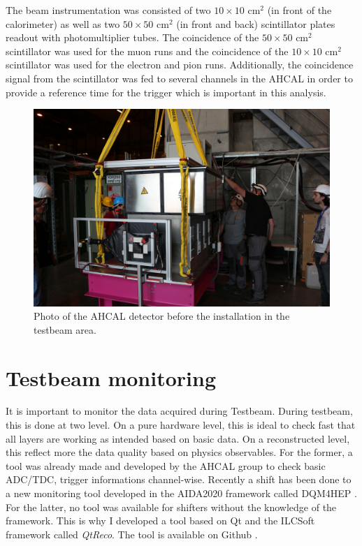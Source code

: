 The beam instrumentation was consisted of two $10 \times 10$ cm$^2$ (in front of the calorimeter) as well as two $50 \times 50$ cm$^2$ (in front and back) scintillator plates readout with photomultiplier tubes. The coincidence of the $50 \times 50$ cm$^2$ scintillator was used for the muon runs and the coincidence of the $10 \times 10$ cm$^2$ scintillator was used for the electron and pion runs. Additionally, the coincidence signal from the scintillator was fed to several channels in the AHCAL in order to provide a reference time for the trigger which is important in this analysis.

\begin{figure}[htbp!]
	\centering
	\includegraphics[width=0.7\linewidth]{chap5/fig_EnergyCalib/IMG_1170.jpg}
	\caption{Photo of the AHCAL detector before the installation in the testbeam area.} \label{fig:AHCAL_photo}
\end{figure}

\section{Testbeam monitoring}

It is important to monitor the data acquired during Testbeam. During testbeam, this is done at two level. On a pure hardware level, this is ideal to check fast that all layers are working as intended based on basic data. On a reconstructed level, this reflect more the data quality based on physics observables. For the former, a tool was already made and developed by the AHCAL group to check basic ADC/TDC, trigger informations channel-wise. Recently a shift has been done to a new monitoring tool developed in the AIDA2020 framework called DQM4HEP \cite{}. For the latter, no tool was available for shifters without the knowledge of the framework. This is why I developed a tool based on Qt and the ILCSoft framework called \textit{QtReco}. The tool is available on Github \cite{GithubTB}.

